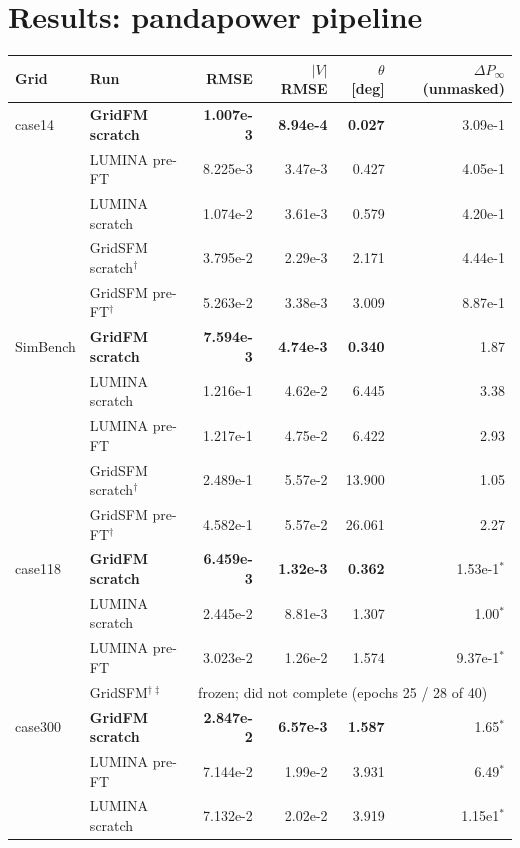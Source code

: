 \documentclass[10pt]{article}
\begin{document}
\section{Results: pandapower pipeline}

\begin{table}[H]
\centering
\small
\begin{tabular}{llrrrr}
\toprule
Grid & Run & RMSE & \(|V|\) RMSE & \(\theta\) [deg] & \(\Delta P_\infty\) (unmasked) \\
\midrule
case14 & \textbf{GridFM scratch} & \textbf{1.007e-3} & \textbf{8.94e-4} & \textbf{0.027} & 3.09e-1 \\
       & LUMINA pre-FT          & 8.225e-3 & 3.47e-3 & 0.427 & 4.05e-1 \\
       & LUMINA scratch         & 1.074e-2 & 3.61e-3 & 0.579 & 4.20e-1 \\
       & GridSFM scratch$^{\dagger}$ & 3.795e-2 & 2.29e-3 & 2.171 & 4.44e-1 \\
       & GridSFM pre-FT$^{\dagger}$  & 5.263e-2 & 3.38e-3 & 3.009 & 8.87e-1 \\
\midrule
SimBench & \textbf{GridFM scratch} & \textbf{7.594e-3} & \textbf{4.74e-3} & \textbf{0.340} & 1.87 \\
         & LUMINA scratch         & 1.216e-1 & 4.62e-2 & 6.445 & 3.38 \\
         & LUMINA pre-FT          & 1.217e-1 & 4.75e-2 & 6.422 & 2.93 \\
         & GridSFM scratch$^{\dagger}$ & 2.489e-1 & 5.57e-2 & 13.900 & 1.05 \\
         & GridSFM pre-FT$^{\dagger}$  & 4.582e-1 & 5.57e-2 & 26.061 & 2.27 \\
\midrule
case118 & \textbf{GridFM scratch} & \textbf{6.459e-3} & \textbf{1.32e-3} & \textbf{0.362} & 1.53e-1$^{\ast}$ \\
        & LUMINA scratch         & 2.445e-2 & 8.81e-3 & 1.307 & 1.00$^{\ast}$ \\
        & LUMINA pre-FT          & 3.023e-2 & 1.26e-2 & 1.574 & 9.37e-1$^{\ast}$ \\
        & GridSFM$^{\dagger\ddagger}$ & \multicolumn{4}{l}{frozen; did not complete (epochs 25 / 28 of 40)} \\
\midrule
case300 & \textbf{GridFM scratch} & \textbf{2.847e-2} & \textbf{6.57e-3} & \textbf{1.587} & 1.65$^{\ast}$ \\
        & LUMINA pre-FT          & 7.144e-2 & 1.99e-2 & 3.931 & 6.49$^{\ast}$ \\
        & LUMINA scratch         & 7.132e-2 & 2.02e-2 & 3.919 & 1.15e1$^{\ast}$ \\

\end{tabular}
\end{table}
\end{document}
